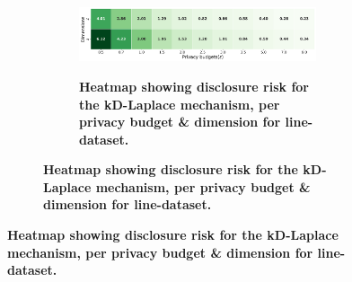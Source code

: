 \newpage
\begin{figure}
    \centering
    \begin{subfigure}[b]{0.85\textwidth}
        \begin{subfigure}[c]{1\textwidth}
            \caption{\textbf{Heatmap showing disclosure risk for the kD-Laplace mechanism, per privacy budget \& dimension for line-dataset.}}
            \includegraphics[width=1\textwidth]{Results/kd-laplace/kd-Laplace/line-dataset/distance.png}
            \label{fig:privacy-risk_line-dataset_adversial_advantage_kd-laplace}
        \end{subfigure}
        \vfill %


\end{subfigure}
\end{figure}
